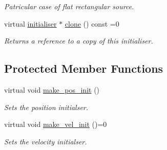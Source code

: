 \begin{DoxyCompactItemize}
\begin{DoxyCompactList}\small\item\em Patricular case of flat rectangular source. \end{DoxyCompactList}\item 
\mbox{\label{classphysim_1_1init_1_1rect__source_a6538f769f29a02ba6323d6c93af6f685}} 
virtual \hyperlink{classphysim_1_1init_1_1initialiser}{initialiser} $\ast$ \hyperlink{classphysim_1_1init_1_1rect__source_a6538f769f29a02ba6323d6c93af6f685}{clone} () const =0
\begin{DoxyCompactList}\small\item\em Returns a reference to a copy of this initialiser. \end{DoxyCompactList}\end{DoxyCompactItemize}
\subsection*{Protected Member Functions}
\begin{DoxyCompactItemize}
\item 
virtual void \hyperlink{classphysim_1_1init_1_1rect__source_a3789669ec12884fe9fe766cefb02a5ed}{make\+\_\+pos\+\_\+init} ()
\begin{DoxyCompactList}\small\item\em Sets the position initialser. \end{DoxyCompactList}\item 
virtual void \hyperlink{classphysim_1_1init_1_1rect__source_a3b825bcedd2d622dabc10aa6a1252cbf}{make\+\_\+vel\+\_\+init} ()=0
\begin{DoxyCompactList}\small\item\em Sets the velocity initialser. \end{DoxyCompactList}\end{DoxyCompactItemize}
